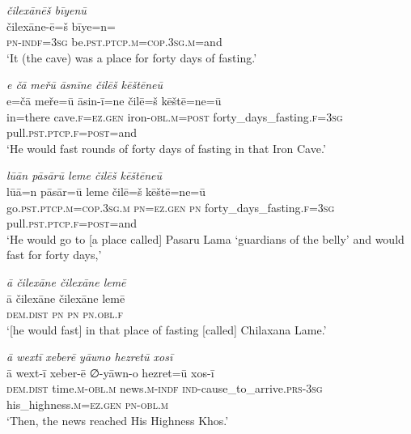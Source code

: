 \ea \label{ŽP.120}
\textit{čilexānēš bīyenū} \\ 
\gll čilexāne-ē=š bīye=n=\\ 
 \textsc{pn}\textsc{-indf}\textsc{=3sg} be\textsc{.pst}\textsc{.ptcp}\textsc{.m}\textsc{=cop}\textsc{.3sg}\textsc{.m}=and \\ 
\glt `It (the cave) was a place for forty days of fasting.'
\z 
 
\ea \label{ŽP.121}
\textit{e čā meřū āsnīne čilēš kēštēneū} \\ 
\gll e=čā meře=ū āsin-ī=ne čilē=š kēštē=ne=ū \\ 
 in=there cave\textsc{.f}\textsc{\textsc{=ez.gen}} iron\textsc{-obl}\textsc{.m}\textsc{=\textsc{post}} forty\_days\_fasting\textsc{.f}\textsc{=3sg} pull\textsc{.pst}\textsc{.ptcp}\textsc{.f}\textsc{=\textsc{post}}=and \\ 
\glt `He would fast rounds of forty days of fasting in that Iron Cave.'
\z 
 
\ea \label{ŽP.122}
\textit{lūān pāsārū leme čilēš kēštēneū} \\ 
\gll lūā=n pāsār=ū leme čilē=š kēštē=ne=ū \\ 
 go\textsc{.pst}\textsc{.ptcp}\textsc{.m}\textsc{=cop}\textsc{.3sg}\textsc{.m} \textsc{pn}\textsc{\textsc{=ez.gen}} \textsc{pn} forty\_days\_fasting\textsc{.f}\textsc{=3sg} pull\textsc{.pst}\textsc{.ptcp}\textsc{.f}\textsc{=\textsc{post}}=and \\ 
\glt `He would go to [a place called] Pasaru Lama ‘guardians of the belly’ and would fast for forty days,'
\z 
 
\ea \label{ŽP.123}
\textit{ā čilexāne čilexāne lemē} \\ 
\gll ā čilexāne čilexāne lemē \\ 
 \textsc{dem.dist} \textsc{pn} \textsc{pn} \textsc{pn}\textsc{.obl}\textsc{.f} \\ 
\glt `[he would fast] in that place of fasting [called] Chilaxana Lame.'
\z 
 
\ea \label{ŽP.124}
\textit{ā wextī xeberē yāwno hezretū xosī} \\ 
\gll ā wext-ī xeber-ē ∅-yāwn-o hezret=ū xos-ī \\ 
 \textsc{dem.dist} time\textsc{.m}\textsc{-obl}\textsc{.m} news\textsc{.m}\textsc{-indf} \textsc{ind-}cause\_to\_arrive\textsc{.prs}\textsc{-3sg} his\_highness\textsc{.m}\textsc{\textsc{=ez.gen}} \textsc{pn}\textsc{-obl}\textsc{.m} \\ 
\glt `Then, the news reached His Highness Khos.'
\z 
 
